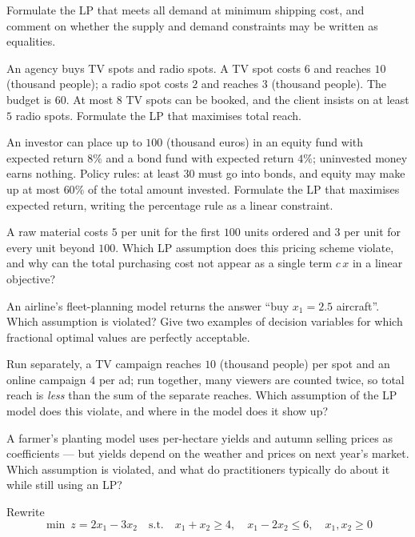 \begin{problems}
        Formulate the LP that meets all demand at minimum shipping cost,
        and comment on whether the supply and demand constraints may be
        written as equalities.
  \item An agency buys TV spots and radio spots. A TV spot costs $6$ and
        reaches $10$ (thousand people); a radio spot costs $2$ and reaches
        $3$ (thousand people). The budget is $60$. At most $8$ TV spots
        can be booked, and the client insists on at least $5$ radio spots.
        Formulate the LP that maximises total reach.
  \item An investor can place up to $100$ (thousand euros) in an equity
        fund with expected return $8\%$ and a bond fund with expected
        return $4\%$; uninvested money earns nothing. Policy rules: at
        least $30$ must go into bonds, and equity may make up at most
        $60\%$ of the total amount invested. Formulate the LP that
        maximises expected return, writing the percentage rule as a linear
        constraint.
  \item A raw material costs $5$ per unit for the first $100$ units
        ordered and $3$ per unit for every unit beyond $100$. Which LP
        assumption does this pricing scheme violate, and why can the total
        purchasing cost not appear as a single term $c\,x$ in a linear
        objective?
  \item An airline's fleet-planning model returns the answer ``buy
        $x_1=2.5$ aircraft''. Which assumption is violated? Give two
        examples of decision variables for which fractional optimal values
        are perfectly acceptable.
  \item Run separately, a TV campaign reaches $10$ (thousand people) per
        spot and an online campaign $4$ per ad; run together, many viewers
        are counted twice, so total reach is \emph{less} than the sum of
        the separate reaches. Which assumption of the LP model does this
        violate, and where in the model does it show up?
  \item A farmer's planting model uses per-hectare yields and autumn
        selling prices as coefficients — but yields depend on the weather
        and prices on next year's market. Which assumption is violated,
        and what do practitioners typically do about it while still using
        an LP?
  \item Rewrite
        \[
          \min\ z=2x_1-3x_2
          \quad\text{s.t.}\quad
          x_1+x_2\ge 4,\quad x_1-2x_2\le 6,\quad x_1,x_2\ge 0
\]
\end{problems}
